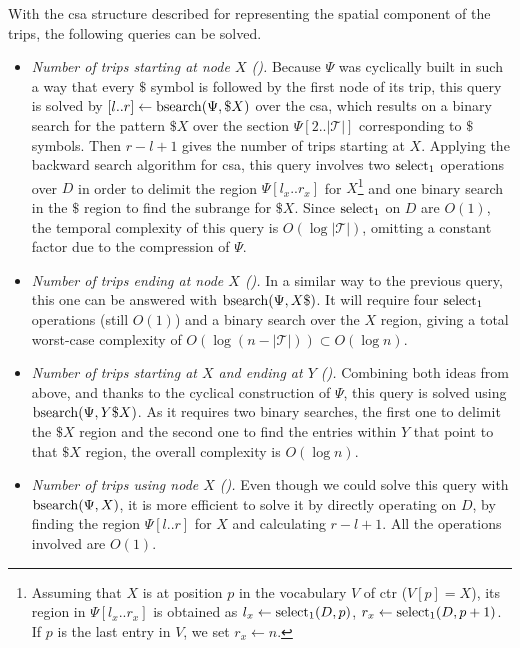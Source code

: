 	With the \gls{csa} structure described for representing the spatial component of the trips,
	the following queries can be solved.

	\begin{itemize}
	\item {\em Number of trips starting at node $X$ (\startX).}
	Because $\Psi$ was cyclically built in such a way that every $\$$ symbol is followed by the first node 
	of its trip, this query is solved by $[l..r]\leftarrow\operatorname{bsearch}(\Psi,\$X)$ over the \gls{csa}, 
	which results on a binary search for the pattern $\$X$ over the section $\Psi[2..|\mathcal{T}|]$ corresponding to $\$$ symbols. 
	Then $r-l+1$ gives the number of trips starting at $X$.
	Applying the backward search algorithm for \gls{csa}, this query involves two $\operatorname{select}_1$ operations over $D$ in order to delimit the region $\Psi[l_x..r_x]$ for $X$\footnote{Assuming that $X$ is at position $p$ in the vocabulary $V$ of \gls{ctr} ($V[p]=X$), its region in $\Psi[l_x..r_x]$ is obtained as $l_x \leftarrow \operatorname{select}_1(D,p)$,  $r_x \leftarrow \operatorname{select}_1(D,p+1)$. If $p$ is the last entry in $V$, we set $r_x \leftarrow n$.} and one binary search in the $\$$ region to find the subrange for $\$X$. Since $\operatorname{select}_1$ on $D$ are $O(1)$, the temporal complexity of this query is $O(\log|\mathcal{T}|)$, omitting a constant factor due to the compression of $\Psi$.

	\item {\em Number of trips ending at node $X$ (\endX).} In a similar way to the previous query, this one can be answered with $\operatorname{bsearch}(\Psi,X\$)$. It will require four $\operatorname{select}_1$ operations (still $O(1)$) and a binary search over the $X$ region, giving a total worst-case complexity of $O(\log (n - |\mathcal{T}|)) \subset O(\log n)$.

	\item {\em Number of trips starting at $X$ and ending at $Y$ (\XtoY).}
	Combining both ideas from above, and thanks to the cyclical construction of $\Psi$, this query is solved using $\operatorname{bsearch}(\Psi,Y\$X)$. As it requires two binary searches, the first one to delimit the $\$X$ region and the second one to find the entries within $Y$ that point to that $\$X$ region, the overall complexity is $O(\log n)$.

	\item {\em Number of trips using node $X$ (\loadX).}
	Even though we could solve this query with $\operatorname{bsearch}(\Psi,X)$, it is more efficient to solve it by directly operating on $D$, by finding the region $\Psi[l..r]$ for $X$ and calculating $r-l+1$. All the operations involved are $O(1)$.


\end{itemize}

